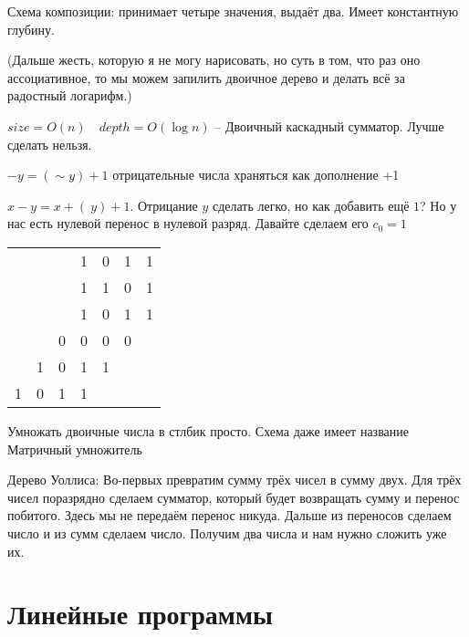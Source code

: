 \documentclass{book}
\theoremstyle{definition}
\begin{document}
Схема композиции: принимает четыре значения, выдаёт два. Имеет константную глубину.

(Дальше жесть, которую я не могу нарисовать, но суть в том, что раз оно ассоциативное, то мы можем запилить двоичное дерево и делать всё за радостный логарифм.)

$size=O(n)\quad depth = O(\log n)$ -- Двоичный каскадный сумматор. Лучше сделать нельзя.

$-y = (\sim y)+1$ отрицательные числа храняться как дополнение +1

$x-y = x+(~y)+1$. Отрицание  $y$ сделать легко, но как добавить ещё $1$? Но у нас есть нулевой перенос в нулевой разряд. Давайте сделаем его $c_0=1$

\begin{tabular}{ccccccc}
    &&&1&0&1&1\\
    &&&1&1&0&1\\
    \hline
    &&&1&0&1&1\\
    &&0&0&0&0&\\
    &1&0&1&1&&\\
    1&0&1&1&&&\\\hline
\end{tabular}

Умножать двоичные числа в стлбик просто. Схема даже имеет название Матричный умножитель

Дерево Уоллиса: 
Во-первых превратим сумму трёх чисел в сумму двух. Для трёх чисел поразрядно сделаем сумматор, который будет возвращать сумму и перенос побитого. Здесь мы не передаём перенос никуда. Дальше из переносов сделаем число и из сумм сделаем число. Получим два числа и нам нужно сложить уже их.

\section{Линейные программы}
\end{document}
